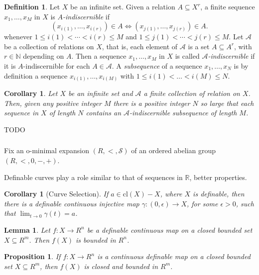 \documentclass{amsart}
\newtheorem{lemma}[theorem]{Lemma}
\newtheorem{proposition}[theorem]{Proposition}
\newtheorem{corollary}[theorem]{Corollary}
\theoremstyle{definition}
\newtheorem{definition}[theorem]{Definition}
\numberwithin{equation}{section}
\begin{document}
\begin{definition}
  Let $X$ be an infinite set.
  Given a relation $A \subseteq X^r$,
  a finite sequence $x_1,\dots,x_M$ in $X$ is \emph{$A$-indiscernible} if 
  \[
    (x_{i(1)},\dots,x_{i(r)})\in A \iff (x_{j(1)},\dots,x_{j(r)}) \in A.
  \]
  whenever $1\le i(1) < \cdots < i(r) \le M$ and
  $1\le j(1) < \cdots < j(r) \le M$.
  Let $\mathcal{A}$ be a collection of relations on $X$,
  that is, each element of $\mathcal{A}$ is a set $A \subseteq A^r$,
  with $r \in\mathbb{N}$ depending on $A$.
  Then a sequence $x_1,\dots,x_M$ in $X$ is called \emph{$\mathcal{A}$-indiscernible} if it is $A$-indiscernible for each $A \in \mathcal{A}$.
  A \emph{subsequence} of a sequence $x_1,\dots,x_N$ is by definition a sequence $x_{i(1)},\dots,x_{i(M)}$ with 
  $1\le i(1)< \dots < i(M) \le N$.
\end{definition}

\begin{corollary}
    Let $X$ be an infinite set and $\mathcal{A}$ a finite collection of relation on $X$.
    Then, given any positive integer $M$ there is a positive integer $N$ so large that each sequence in $X$ of length $N$ contains an $\mathcal{A}$-indiscernible subsequence of length $M$.
\end{corollary}

TODO

\subsubsection{}
Fix an o-minimal expansion $(R,<,\mathcal{S})$ of an ordered abelian group $(R,<,0,-,+)$.

Definable curves play a role similar to that of sequences in $\mathbb{R}$, better properties.

\begin{corollary}[Curve Selection]
    If $a\in\mathrm{cl}(X)-X$,
    where $X$ is definable,
    then there is a definable continuous injective map
    $\gamma: (0,\epsilon) \to X$, for some $\epsilon > 0$,
    such that $\lim_{t\to 0}\gamma(t) = a$.
\end{corollary}

\begin{lemma}
    Let $f: X \to R^n$ be a definable continuous map on a closed bounded set $X \subseteq R^m$.
    Then $f(X)$ is bounded in $R^n$.
\end{lemma}

\begin{proposition}
    If $f: X \to R^n$ is a continuous definable map on a closed bounded set $X \subseteq R^m$,
    then $f(X)$ is closed and bounded in $R^m$.
\end{proposition}
\end{document}
